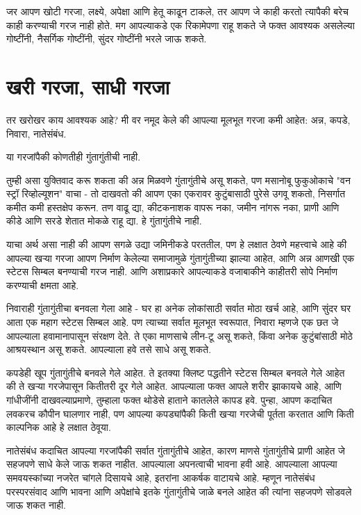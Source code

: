 जर आपण खोटी गरजा, लक्ष्ये, अपेक्षा आणि हेतू काढून टाकले, तर आपण जे काही करतो त्यापैकी बरेच काही करण्याची गरज नाही होते. मग आपल्याकडे एक रिकामेपणा राहू शकते जे फक्त आवश्यक असलेल्या गोष्टींनी, नैसर्गिक गोष्टींनी, सुंदर गोष्टींनी भरले जाऊ शकते.

\chapter{खरी गरजा, साधी गरजा}

तर खरोखर काय आवश्यक आहे? मी वर नमूद केले की आपल्या मूलभूत गरजा कमी आहेत: अन्न, कपडे, निवारा, नातेसंबंध.

या गरजांपैकी कोणतीही गुंतागुंतीची नाही.

तुम्ही असा युक्तिवाद करू शकता की अन्न मिळवणे गुंतागुंतीचे असू शकते, पण मसानोबू फुकुओकाचे "वन स्ट्रॉ रिव्होल्यूशन" वाचा - तो दाखवतो की आपण एका एकरावर कुटुंबासाठी पुरेसे उगवू शकतो, निसर्गात कमीत कमी हस्तक्षेप करून. तण वाढू द्या, कीटकनाशक वापरू नका, जमीन नांगरू नका, प्राणी आणि कीडे आणि सरडे शेतात मोकळे राहू द्या. हे गुंतागुंतीचे नाही.

याचा अर्थ असा नाही की आपण सगळे उद्या जमिनीकडे परततील, पण हे लक्षात ठेवणे महत्त्वाचे आहे की आपल्या खऱ्या गरजा आपण निर्माण केलेल्या समाजामुळे गुंतागुंतीच्या झाल्या आहेत, आणि अन्न आणखी एक स्टेटस सिम्बल बनण्याची गरज नाही. आणि अशाप्रकारे आपल्याकडे वजाबाकीने काहीतरी सोपे निर्माण करण्याची क्षमता आहे.

निवाराही गुंतागुंतीचा बनवला गेला आहे - घर हा अनेक लोकांसाठी सर्वात मोठा खर्च आहे, आणि सुंदर घर आता एक महाग स्टेटस सिम्बल आहे. पण त्याच्या सर्वात मूलभूत स्वरूपात, निवारा म्हणजे एक छत जे आपल्याला हवामानापासून संरक्षण देते. ते एका माणसाचे लीन-टू असू शकते, किंवा अनेक कुटुंबांसाठी मोठे आश्रयस्थान असू शकते. आपल्याला हवे तसे साधे असू शकते.

कपडेही खूप गुंतागुंतीचे बनवले गेले आहेत. ते इतक्या क्लिष्ट पद्धतीने स्टेटस सिम्बल बनवले गेले आहेत की ते खऱ्या गरजेपासून कितीतरी दूर गेले आहेत. आपल्याला फक्त आपले शरीर झाकायचे आहे, आणि गांधीजींनी दाखवल्याप्रमाणे, तुम्हाला फक्त थोडेसे हाताने कातलेले कापड हवे. पुन्हा, आपण कदाचित लवकरच कौपीन घालणार नाही, पण आपल्या कपड्यांपैकी किती खऱ्या गरजेची पूर्तता करतात आणि किती काल्पनिक आहे हे लक्षात ठेवूया.

नातेसंबंध कदाचित आपल्या गरजांपैकी सर्वात गुंतागुंतीचे आहेत, कारण माणसे गुंतागुंतीचे प्राणी आहेत जे सहजपणे साधे केले जाऊ शकत नाहीत. आपल्याला अपनत्वाची भावना हवी आहे. आपल्याला आपल्या समवयस्कांच्या नजरेत चांगले दिसायचे आहे, इतरांना आकर्षक वाटायचे आहे. म्हणून नातेसंबंध परस्परसंवाद आणि भावना आणि अपेक्षांचे इतके गुंतागुंतीचे जाळे बनले आहेत की त्यांना सहजपणे सोडवले जाऊ शकत नाही.

